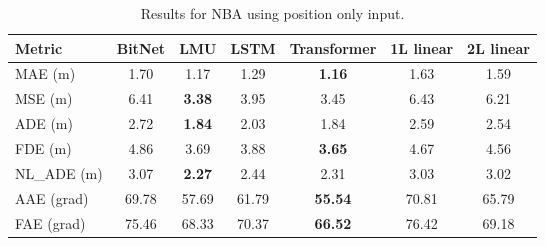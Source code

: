 \begin{table}[H]
\centering
\caption{Results for NBA using position only input.}
\label{pos:NBA1}
\begin{tabular}{l||c|c|c|c|c|c}
Metric & BitNet & LMU & LSTM & Transformer & 1L linear & 2L linear\\
\hline \hline
MAE (m) & 1.70 & 1.17 & 1.29 & \textbf{1.16} & 1.63 & 1.59 \\
MSE (m) & 6.41 & \textbf{3.38} & 3.95 & 3.45 & 6.43 & 6.21 \\
ADE (m) & 2.72 & \textbf{1.84} & 2.03 & 1.84 & 2.59 & 2.54 \\
FDE (m) & 4.86  & 3.69 & 3.88 & \textbf{3.65} & 4.67 & 4.56\\
NL\_ADE (m) & 3.07  & \textbf{2.27} & 2.44  & 2.31 & 3.03  & 3.02 \\
AAE (grad) & 69.78  & 57.69 & 61.79 & \textbf{55.54} & 70.81 & 65.79 \\
FAE (grad) & 75.46 & 68.33 & 70.37 & \textbf{66.52} & 76.42 & 69.18  \\
\end{tabular}
\end{table}
